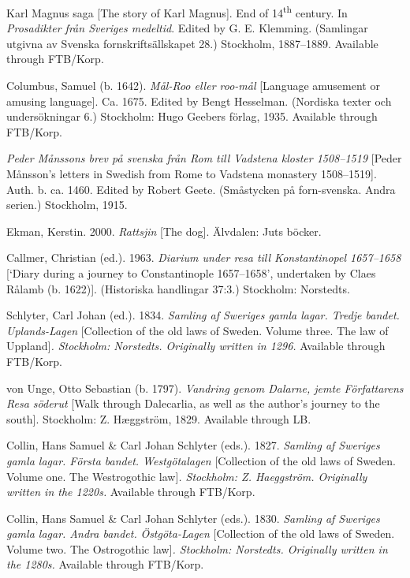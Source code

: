 \documentclass[output=paper]{langscibook}
\begin{document}
\begin{description}[font=\normalfont]
\item[KM:] Karl Magnus saga [The story of Karl Magnus]. End of 14\textsuperscript{th} century. In \textit{Prosadikter från Sveriges medeltid}. Edited by G. E. Klemming. (Samlingar utgivna av Svenska fornskriftsällskapet 28.) Stockholm, 1887–1889. Available through FTB/Korp.
\item[Mål-roo:] Columbus, Samuel (b. 1642). \textit{Mål-Roo eller roo-mål} [Language amusement or amusing language]. Ca. 1675. Edited by Bengt Hesselman. (Nordiska texter och undersökningar 6.) Stockholm: Hugo Geebers förlag, 1935. Available through FTB/Korp.
\item[Måns:] \textit{Peder Månssons brev på svenska från Rom till Vadstena kloster 1508–1519} [Peder Månsson’s letters in Swedish from Rome to Vadstena monastery 1508–1519]. Auth. b. ca. 1460. Edited by Robert Geete. (Småstycken på forn-svenska. Andra serien.) Stockholm, 1915.
\item[Rattsjin:] Ekman, Kerstin. 2000. \textit{Rattsjin} [The dog]. Älvdalen: Juts böcker. 
\item[Rålamb:] Callmer, Christian (ed.). 1963. \textit{Diarium under resa till Konstantinopel 1657–1658} [`Diary during a journey to Constantinople 1657–1658’, undertaken by Claes Rålamb (b. 1622)]. (Historiska handlingar 37:3.) Stockholm: Norstedts.
\item[UL:] Schlyter, Carl Johan (ed.). 1834. \emph{Samling af Sweriges gamla lagar. Tredje bandet.} \textit{Uplands-Lagen} [Collection of the old laws of Sweden. Volume three. The law of Uppland]\emph{. Stockholm: Norstedts. Originally written in 1296.} Available through FTB/Korp.
\item[von Unge:] von Unge, Otto Sebastian (b. 1797). \textit{Vandring genom Dalarne, jemte Författarens Resa söderut} [Walk through Dalecarlia, as well as the author’s journey to the south]. Stockholm: Z. Hæggström, 1829. Available through LB.
\item[EWL:] Collin, Hans Samuel \& Carl Johan Schlyter (eds.). 1827. \emph{Samling af Sweriges gamla lagar. Första bandet. Westgötalagen} [Collection of the old laws of Sweden. Volume one. The Westrogothic law]\emph{. Stockholm: Z. Haeggström. Originally written in the 1220s.} Available through FTB/Korp.~
\item[ÖgL:] Collin, Hans Samuel \& Carl Johan Schlyter (eds.). 1830. \emph{Samling af Sweriges gamla lagar. Andra bandet.} \textit{Östgöta-Lagen} [Collection of the old laws of Sweden. Volume two. The Ostrogothic law]\emph{. Stockholm: Norstedts. Originally written in the 1280s.} Available through FTB/Korp.
\end{description}
\end{document}
